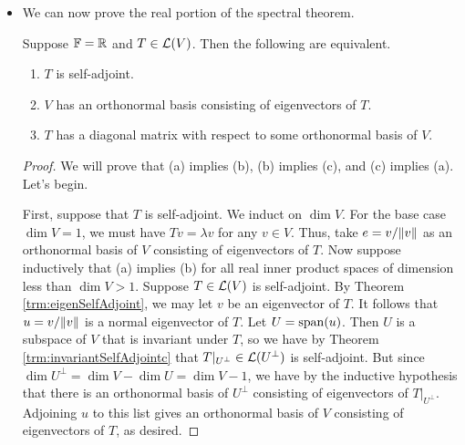 \documentclass[../main.tex]{subfiles}
\begin{document}
\begin{itemize}
\begin{theorem}
\begin{enumerate}[label={\textup{(}\alph*\textup{)}},ref={\thetheorem\alph*}]
\begin{proof}
                If $u,v\in U$, then
                \begin{equation*}
                    \inp{(T|_U)u}{v} = \inp{Tu}{v} = \inp{u}{Tv} = \inp{u}{(T|_U)v}
                \end{equation*}
                as desired.
            \end{proof}
            \item \label{trm:invariantSelfAdjointc}$T|_{U^\perp}\in\ope{U^\perp}$ is self-adjoint.
            \begin{proof}
                The proof is symmetric to that of Theorem \ref{trm:invariantSelfAdjointb}.
            \end{proof}
        \end{enumerate}
    \end{theorem}
    \item We can now prove the real portion of the spectral theorem.
    \begin{theorem}
        Suppose $\mathbb{F}=\mathbb{R}$ and $T\in\mathcal{L}(V)$. Then the following are equivalent.
        \begin{enumerate}[label={\textup{(}\alph*\textup{)}}]
            \item $T$ is self-adjoint.
            \item $V$ has an orthonormal basis consisting of eigenvectors of $T$.
            \item $T$ has a diagonal matrix with respect to some orthonormal basis of $V$.
        \end{enumerate}
        \begin{proof}
            We will prove that (a) implies (b), (b) implies (c), and (c) implies (a). Let's begin.\par
            First, suppose that $T$ is self-adjoint. We induct on $\dim V$. For the base case $\dim V=1$, we must have $Tv=\lambda v$ for any $v\in V$. Thus, take $e=v/\norm{v}$ as an orthonormal basis of $V$ consisting of eigenvectors of $T$. Now suppose inductively that (a) implies (b) for all real inner product spaces of dimension less than $\dim V>1$. Suppose $T\in\mathcal{L}(V)$ is self-adjoint. By Theorem \ref{trm:eigenSelfAdjoint}, we may let $v$ be an eigenvector of $T$. It follows that $u=v/\norm{v}$ is a normal eigenvector of $T$. Let $U=\operatorname{span}(u)$. Then $U$ is a subspace of $V$ that is invariant under $T$, so we have by Theorem \ref{trm:invariantSelfAdjointc} that $T|_{U^\perp}\in\ope{U^\perp}$ is self-adjoint. But since $\dim U^\perp=\dim V-\dim U=\dim V-1$, we have by the inductive hypothesis that there is an orthonormal basis of $U^\perp$ consisting of eigenvectors of $T|_{U^\perp}$. Adjoining $u$ to this list gives an orthonormal basis of $V$ consisting of eigenvectors of $T$, as desired.\par

\end{proof}
\end{theorem}
\end{itemize}
\end{document}
